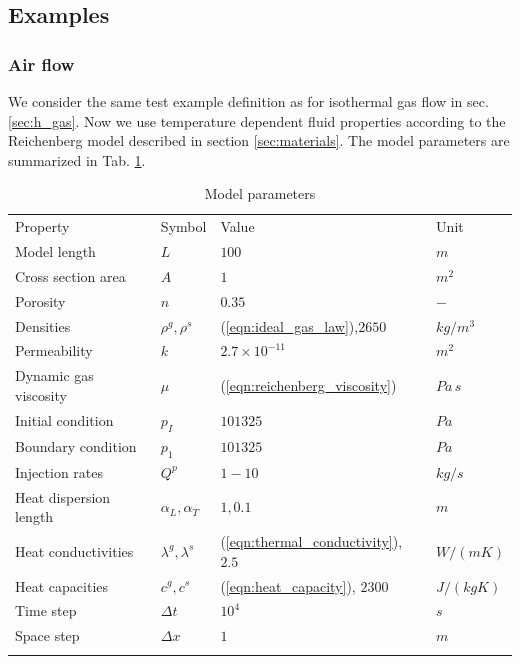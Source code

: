 \newpage
\subsection{Examples}

\subsubsection{Air flow}

We consider the same test example definition as for isothermal gas flow in sec. \ref{sec:h_gas}.
Now we use temperature dependent fluid properties according to the Reichenberg model described in section \ref{sec:materials}.
The model parameters are summarized in Tab. \ref{tab:air_heat_1d}.

\begin{table}[!htb]
\centering
\begin{tabular}{llll}
\hline\hline\noalign{\smallskip}
Property & Symbol & Value & Unit \\
\noalign{\smallskip}\hline\noalign{\smallskip}
Model length & $L$ & $100$ & $m$\\
Cross section area & $A$ & $1$  & $m^2$ \\
Porosity & $n$ & $0.35$  & $-$ \\
Densities & $\rho^g,\rho^s$ & (\ref{eqn:ideal_gas_law}),$2650$ & $kg/m^3$ \\
\hline
Permeability & $k$ & $2.7\times 10^{-11}$ & $m^2$\\
Dynamic gas viscosity & $\mu$ & (\ref{eqn:reichenberg_viscosity}) & $Pa\,s$\\
Initial condition & $p_I$ & $101325$ & $Pa$\\
Boundary condition & $p_1$ & $101325$ & $Pa$\\
Injection rates & $Q^p$ & $1-10$ & $kg/s$\\
\hline
Heat dispersion length & $\alpha_L,\alpha_T$ & $1,0.1$ & $m$\\
Heat conductivities & $\lambda^g,\lambda^s$ & (\ref{eqn:thermal_conductivity}), $2.5$ & $W/(m K)$\\
Heat capacities & $c^g,c^s$ & (\ref{eqn:heat_capacity}), $2300$ & $J/(kg K)$\\
\hline
Time step & $\Delta t$ & $10^4$ & $s$\\
Space step & $\Delta x$ & $1$ & $m$\\
\noalign{\smallskip}\hline\hline
\end{tabular}
\caption{Model parameters}
\label{tab:air_heat_1d}
\end{table}

